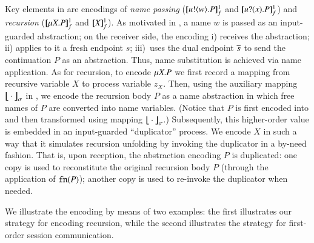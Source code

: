 \documentclass[preprint,11pt]{elsarticle}
\begin{document}
{{{Key elements in 
 are encodings of 
{\em name passing} ($[\!\![u ! \langle w \rangle . P]\!\!]^1_f$ and $[\!\![u ? (x) . P]\!\!]^1_f$)  and  
{\em recursion} ($[\!\![\mu X. P]\!\!]^1_f$ and $[\!\![X]\!\!]^1_f$).
As motivated in , %
a name $w$ is passed as an input-guarded abstraction;
on the receiver side,
the encoding %
i) receives
the abstraction; ii) applies to it a fresh  endpoint $s$;
iii)~uses the dual endpoint $\overline{s}$ to send the continuation $P$ as an abstraction.
Thus, name substitution is achieved via name application.
As for recursion, to encode $\mu X. P$ we
first record a mapping from recursive variable $X$ to process variable $z_X$.
Then, using the auxiliary mapping
$\big\lfloor\!\!\big\lfloor\cdot\big\rfloor\!\!\big\rfloor^{}_\sigma$ in 
, we encode the recursion body $P$ as a name abstraction
in which free names of $P$ are converted into name variables.
(Notice that $P$ is first encoded into \HO and then transformed using mapping
$\big\lfloor\!\!\big\lfloor\cdot\big\rfloor\!\!\big\rfloor^{}_\sigma$.)
Subsequently, this higher-order value is embedded in an input-guarded 
``duplicator'' process. We encode $X$ 
in such a way that it
simulates recursion unfolding by 
invoking the duplicator in a by-need fashion.
That is, upon reception, the \HO abstraction encoding  
$P$
is duplicated: 
one copy is used to reconstitute the original recursion body $P$ (through
the application of $\mathtt{fn}(P)$); another copy is used to re-invoke
the duplicator when needed. %

We illustrate the encoding by means of two examples: the first illustrates our strategy for encoding recursion, while the second illustrates the strategy for first-order session communication.}


 


}}
\end{document}
